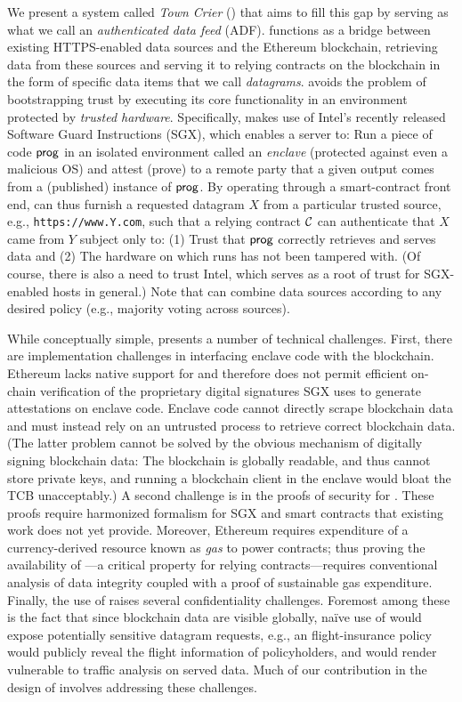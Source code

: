 We present a system called \emph{Town Crier} (\tc) that aims to fill this gap by serving as what we call an \emph{authenticated data feed} (ADF). \tc functions as a bridge between existing HTTPS-enabled data sources and the Ethereum blockchain, retrieving data from these sources and serving it to relying contracts on the blockchain in the form of specific data items that we call \emph{datagrams}. \tc avoids the problem of bootstrapping trust by executing its core functionality in an environment protected by \emph{trusted hardware}. Specifically, \tc makes use of Intel's recently released Software Guard Instructions (SGX), which enables a server to: Run a piece of code ${\sf prog}$ in an isolated environment called an \emph{enclave} (protected against even a malicious OS) and attest (prove) to a remote party that a given output comes from a (published) instance of ${\sf prog}$. By operating through a smart-contract front end, \tc can thus furnish a requested datagram $X$ from a particular trusted source, e.g., \texttt{https://www.Y.com}, such that a relying contract ${\cal C}$ can authenticate that $X$ came from $Y$ subject only to: (1) Trust that ${\sf prog}$ correctly retrieves and serves data and (2) The hardware on which \tc runs has not been tampered with. (Of course, there is also a need to trust Intel, which serves as a root of trust for SGX-enabled hosts in general.) Note that \tc can combine data sources according to any desired policy (e.g., majority voting across sources).

While conceptually simple, \tc presents a number of technical challenges. First, there are implementation challenges in interfacing enclave code with the blockchain. Ethereum lacks native support for and therefore does not permit efficient on-chain verification of the proprietary digital signatures SGX uses to generate attestations on enclave code. Enclave code cannot directly scrape blockchain data and must instead rely on an untrusted process to retrieve correct blockchain data. (The latter problem cannot be solved by the obvious mechanism of digitally signing blockchain data: The blockchain is globally readable, and thus cannot store private keys, and running a blockchain client in the enclave would bloat the TCB unacceptably.) A second challenge is in the proofs of security for \tc. These proofs require harmonized formalism for SGX and smart contracts that existing work does not yet provide. Moreover, Ethereum requires expenditure of a currency-derived resource known as \emph{gas} to power contracts; thus proving the availability of \tc---a critical property for relying contracts---requires conventional analysis of data integrity coupled with a proof of sustainable gas expenditure. Finally, the use of \tc raises several confidentiality challenges. Foremost among these is the fact that since blockchain data are visible globally, na\"{i}ve use of \tc would expose potentially sensitive datagram requests, e.g., an flight-insurance policy would publicly reveal the flight information of policyholders, and would render \tc vulnerable to traffic analysis on served data. Much of our contribution in the design of \tc involves addressing these challenges. 

